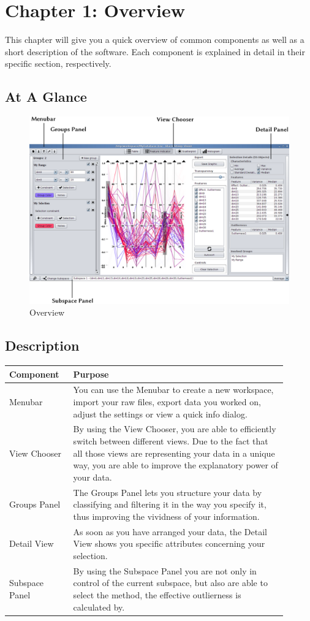 
\section{\color{fancy}Chapter 1: Overview}
This chapter will give you a quick overview of common components as well as a short description of the software. Each component is explained in detail in their specific section, respectively.

\subsection{At A Glance}
\begin{figure}[h]
  \centering
  \includegraphics[width=12cm]{images/bsv/Overview.png}
  \caption{Overview}
  \label{fig:overview}
\end{figure}

\subsection{Description}
\begin{tabular}{p{0.2\linewidth}p{0.7\linewidth}}
  \color{fancy}Component & \color{fancy}Purpose \\ \hline
  Menubar & You can use the Menubar to create a new workspace, import your raw files, export data you worked on, adjust the settings or view a quick info dialog. \\ \hline
  View Chooser & By using the View Chooser, you are able to efficiently switch between different views. Due to the fact that all those views are representing your data in a unique way, you are able to improve the explanatory power of your data.  \\ \hline
  Groups Panel & The Groups Panel lets you structure your data by classifying and filtering it in the way you specify it, thus improving the vividness of your information. \\ \hline
  Detail View &  As soon as you have arranged your data, the Detail View shows you specific attributes concerning your selection. \\ \hline
  Subspace Panel & By using the Subspace Panel you are not only in control of the current subspace, but also are able to select the method, the effective outlierness is calculated by. \\ \hline
\end{tabular}
